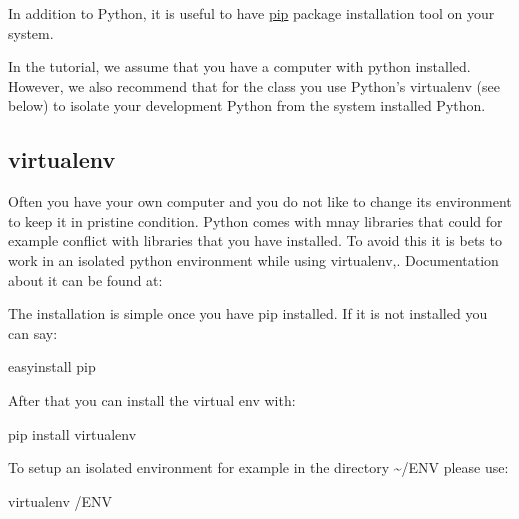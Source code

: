 In addition to Python, it is useful to have \href{https://pypi.python.org/pypi/pip}{pip} package installation tool on your
system.

In the tutorial, we assume that you have a computer with python
installed.  However, we also recommend that for the class you use
Python's virtualenv (see below) to isolate your development Python
from the system installed Python.


\subsection{virtualenv}
\label{\detokenize{lesson/prg/python_intro:id2}}\label{\detokenize{lesson/prg/python_intro:id3}}
Often you have your own computer and you do not like to change its
environment to keep it in pristine condition. Python comes with mnay
libraries that could for example conflict with libraries that you have
installed. To avoid this it is bets to work in an isolated python
environment while using virtualenv,. Documentation about it can be
found at:

\begin{sphinxVerbatim}[commandchars=\\\{\}]
 
\end{sphinxVerbatim}

The installation is simple once you have pip installed. If it is not
installed you can say:

\begin{sphinxVerbatim}[commandchars=\\\{\}]
\PYGZdl{} easy\PYGZus{}install pip
\end{sphinxVerbatim}

After that you can install the virtual env with:

\begin{sphinxVerbatim}[commandchars=\\\{\}]
\PYGZdl{} pip install virtualenv
\end{sphinxVerbatim}

To setup an isolated environment for example in the directory \textasciitilde{}/ENV
please use:

\begin{sphinxVerbatim}[commandchars=\\\{\}]
\PYGZdl{} virtualenv \PYGZti{}/ENV
\end{sphinxVerbatim}

